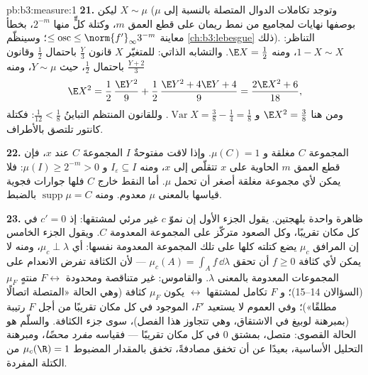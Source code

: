 \begin{solution}{pb:b3:measure:1}
\textbf{21.} ليكن $X \sim \mu$ (وتوجد تكاملات الدوال المتصلة
بالنسبة إلى $\mu$ بوصفها نهايات لمجاميع من نمط ريمان على قطع
العمق $m$، وكتلة كلٍّ منها $2^{-m}$، بخطأ معاينة $\leq \operatorname{osc} \leq
\norm{f'}_\infty3^{-m}$؛
وسينظّم \cref{ch:b3:lebesgue} ذلك). التناظر: $1 - X \sim X$، ومنه $\E X =
\frac12$.
والتشابه الذاتي: للمتغيّر $X$ قانون $\frac Y3$ باحتمال $\frac12$
وقانون $\frac{Y+2}3$ باحتمال $\frac12$، حيث $Y \sim \mu$، ومنه
\[
\E X^2 = \frac12\,\frac{\E Y^2}9 + \frac12\,
\frac{\E Y^2 + 4\E Y + 4}{9} = \frac{2\E X^2 + 6}{18},
\]
ومن هنا $\E X^2 = \frac38$ و $\operatorname{Var}X = \frac38
- \frac14 = \frac18$. وللقانون المنتظم التباينُ $\frac1{12} < \frac18$:
فكتلة كانتور تلتصق بالأطراف.

\textbf{22.} المجموعة $C$ مغلقة و $\mu(C) = 1$. وإذا لاقت
مفتوحةٌ $I$ المجموعةَ $C$ عند $x$، فإن قطع العمق $m$ الحاوية
على $x$ تتقلّص إلى $x$، ومنه $I_\varepsilon \subseteq I$ و $\mu(I) \geq
2^{-m} > 0$: فلا يمكن لأي
مجموعة مغلقة أصغر أن تحمل $\mu$. أما النقط خارج $C$ فلها جوارات
فجوية قياسها بالمعنى $\mu$ معدوم. ومنه $\operatorname{supp}\mu = C$ بالضبط.

\textbf{23.} ظاهرة واحدة بلهجتين. يقول الجزء الأول إن نموّ $c$
غير مرئي لمشتقها: إذ $c' = 0$ في كل مكان تقريبًا، وكل الصعود
متركّز على المجموعة المعدومة  $C$. ويقول الجزء الخامس إن
 المرافق $\mu_c$ يضع كتلته كلها على تلك المجموعة المعدومة
 نفسها: أي $\mu_c \perp \lambda$، ومنه لا يمكن لأي كثافة $f \geq
0$ أن
تحقق $\mu_c(A) = \int_Af\,\dd\lambda$ --- لأن الكثافة تفرض الانعدام على المجموعات
المعدومة  بالمعنى $\lambda$. والقاموس: غير متناقصة ومحدودة
$F \leftrightarrow$  منتهٍ $\mu_F$ (السؤالان 14--15)؛ و $F$ تكامل
لمشتقها $\leftrightarrow$ يكون  $\mu_F$ كثافة (وهي الحالة «المتصلة
اتصالًا مطلقًا»)؛ وفي العموم لا يستعيد $F'$، الموجود في كل مكان
تقريبًا من أجل $F$ رتيبة (بمبرهنة لوبيغ في الاشتقاق، وهي تتجاوز
هذا الفصل)، سوى جزء الكثافة. والسلّم هو الحالة القصوى: متصل،
بمشتق $0$ في كل مكان تقريبًا --- فقياسه \emph{مفرد محضًا}،
ومبرهنة التحليل الأساسية، بعيدًا عن أن تخفق مصادفةً، تخفق
بالمقدار المضبوط $\mu_c(\R) = 1$ من الكتلة المفردة.


\end{solution}
